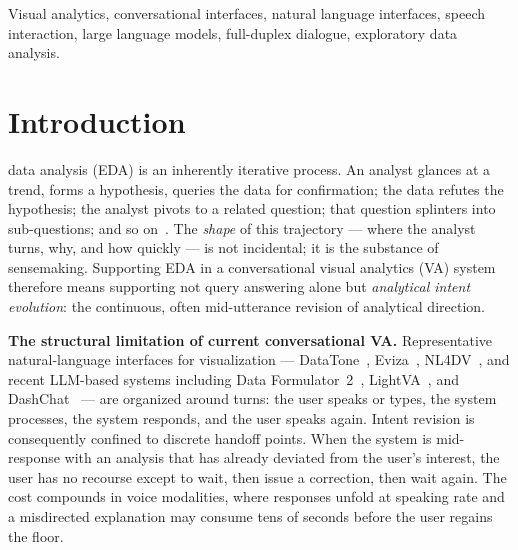 \documentclass[journal]{IEEEtran}
\begin{document}
\begin{IEEEkeywords}
Visual analytics, conversational interfaces, natural language interfaces, speech interaction, large language models, full-duplex dialogue, exploratory data analysis.
\end{IEEEkeywords}

\section{Introduction}
\label{sec:intro}
 data analysis (EDA) is an inherently iterative process. An analyst glances at a trend, forms a hypothesis, queries the data for confirmation; the data refutes the hypothesis; the analyst pivots to a related question; that question splinters into sub-questions; and so on~\cite{pirolli2005sensemaking,kandel2012enterprise}. The \emph{shape} of this trajectory --- where the analyst turns, why, and how quickly --- is not incidental; it is the substance of sensemaking. Supporting EDA in a conversational visual analytics (VA) system therefore means supporting not query answering alone but \emph{analytical intent evolution}: the continuous, often mid-utterance revision of analytical direction.

\textbf{The structural limitation of current conversational VA.}
Representative natural-language interfaces for visualization --- DataTone~\cite{gao2015datatone}, Eviza~\cite{setlur2016eviza}, NL4DV~\cite{narechania2021nl4dv}, and recent LLM-based systems including Data Formulator~2~\cite{wang2024dataformulator2}, LightVA~\cite{zhao2024lightva}, and DashChat~\cite{cheng2026dashchat} --- are organized around turns: the user speaks or types, the system processes, the system responds, and the user speaks again. Intent revision is consequently confined to discrete handoff points. When the system is mid-response with an analysis that has already deviated from the user's interest, the user has no recourse except to wait, then issue a correction, then wait again. The cost compounds in voice modalities, where responses unfold at speaking rate and a misdirected explanation may consume tens of seconds before the user regains the floor.
\end{document}
